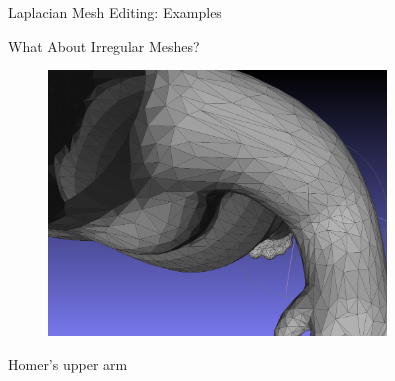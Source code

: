 \documentclass{beamer}
\begin{document}
\begin{frame}{Laplacian Mesh Editing: Examples}
\begin{figure}
{\begin{minipage}{0.5\textwidth}
\end{minipage}
}
\end{figure}



\end{frame}

\begin{frame}{What About Irregular Meshes?}

\begin{figure}[t]
    \includegraphics[width=0.8\textwidth]{HomerIrregular.png}
\end{figure}

Homer's upper arm

\end{frame}
\end{document}
